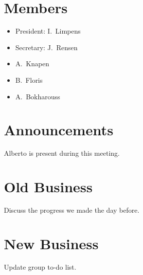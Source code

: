 \section{Members}
\begin{itemize}
	\item President: I.~Limpens
    \item Secretary: J.~Rensen
    \item A.~Knapen
    \item B.~Floris
    \item A.~Bokharouss
\end{itemize}

\section{Announcements}
\begin{items}
	\item Alberto is present during this meeting.
\end{items}


\section{Old Business}
\begin{items}
	\item Discuss the progress we made the day before.
\end{items}


\section{New Business}
\begin{items}
    \item Update group to-do list.
\end{items}

\vspace{1em}
